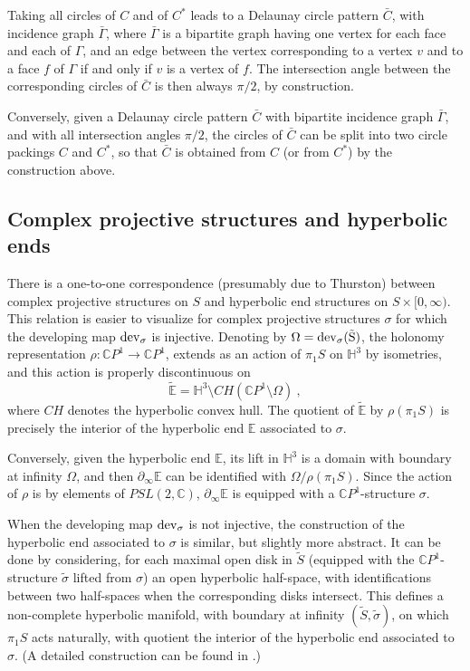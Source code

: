 \documentclass[notitlepage,twoside,a4paper]{amsart}
\theoremstyle{named}
\newcommand{\C}{{\mathbb C}}
\newcommand{\CP}{{\mathbb CP}}
\newcommand{\HH}{{\mathbb H}}
\newcommand{\bE}{{\mathbb E}}
\newcommand{\dev}{\rm{dev}}
\newcounter{notes}%
\begin{document}
Taking all circles of $C$ and of $C^*$ leads to a Delaunay circle pattern $\bar C$, with incidence graph $\bar\Gamma$, where $\bar\Gamma$ is a bipartite graph having one vertex for each face and each of $\Gamma$, and an edge between the vertex corresponding to a vertex $v$ and to a face $f$ of $\Gamma$ if and only if $v$ is a vertex of $f$. The intersection angle between the corresponding circles of $\bar C$ is then always $\pi/2$, by construction.

Conversely, given a Delaunay circle pattern $\bar C$ with bipartite incidence graph $\bar\Gamma$, and with all intersection angles $\pi/2$, the circles of $\bar C$ can be split into two circle packings $C$ and $C^*$, so that $\bar C$ is obtained from  $C$ (or from $C^*$) by the construction above.

\subsection{Complex projective structures and hyperbolic ends}
\label{ssc:complex-ends}

There is a one-to-one correspondence (presumably due to Thurston) between complex projective structures on $S$ and hyperbolic end structures on $S\times [0,\infty)$. This relation is easier to visualize for complex projective structures $\sigma$ for which the developing map $\dev_\sigma$ is injective. Denoting by $\Omega=\dev_\sigma(\tilde S)$, the holonomy representation $\rho:\CP^1\to \CP^1$, extends as an action of $\pi_1S$ on $\HH^3$ by isometries, and this action is properly discontinuous on
$$ \tilde \bE = \HH^3\setminus CH(\CP^1\setminus \Omega)~, $$
where $CH$ denotes the hyperbolic convex hull. The quotient of $\tilde \bE$ by $\rho(\pi_1S)$ is precisely the interior of the hyperbolic end $\bE$ associated to $\sigma$.

Conversely, given the hyperbolic end $\bE$, its lift in $\HH^3$ is a domain with boundary at infinity $\Omega$, and then $\partial_\infty \bE$ can be identified with $\Omega/\rho(\pi_1S)$. Since the action of $\rho$ is by elements of $PSL(2,\C)$, $\partial_\infty\bE$ is equipped with a $\CP^1$-structure $\sigma$.

When the developing map $\dev_\sigma$ is not injective, the construction of the hyperbolic end associated to $\sigma$ is similar, but slightly more abstract. It can be done by considering, for each maximal open disk in $\tilde S$ (equipped with the $\CP^1$-structure $\tilde\sigma$ lifted from $\sigma$) an open hyperbolic half-space, with identifications between two half-spaces when the corresponding disks intersect. This defines a non-complete hyperbolic manifold, with boundary at infinity $(\tilde S,\tilde\sigma)$, on which $\pi_1S$ acts naturally, with quotient the interior of the hyperbolic end associated to $\sigma$. (A detailed construction can be found in \cite{kulkarni-pinkall}.)
\end{document}
